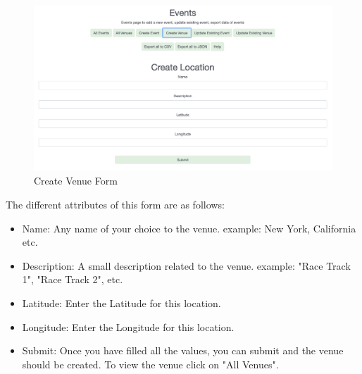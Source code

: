 \documentclass[12pt, letterpaper]{article}
\begin{document}
{{{{{{{{{\begin{figure}[h!]
	\centering
	\includegraphics[width=1\columnwidth]{assets/create_venue_form.png}
	\caption{Create Venue Form}
	\end{figure}	

The different attributes of this form are as follows:
\begin{itemize}
	\item Name: Any name of your choice to the venue. example: New York, California etc.
	\item Description: A small description related to the venue. example: "Race Track 1", "Race Track 2", etc.
	\item Latitude: Enter the Latitude for this location.
	\item Longitude: Enter the Longitude for this location.
	\item Submit: Once you have filled all the values, you can submit and the venue should be created. To view the venue click on "All Venues".
\end{itemize}
	
}}}}}}}}}
\end{document}
